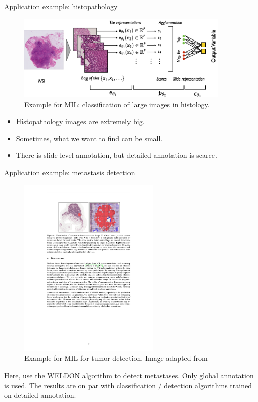 \documentclass[xcolor=pdftex,dvipsnames,table]{beamer}
\begin{document}
\begin{frame}{Application example: histopathology}
\begin{figure}[htb]
   \centering
   \includegraphics[width=0.9\textwidth]{../graphics/histo_ex2.pdf}
   \caption{Example for MIL: classification of large images in histology.}
\end{figure}
\begin{itemize}
\item Histopathology images are extremely big.
\item Sometimes, what we want to find can be small.
\item There is slide-level annotation, but detailed annotation is scarce.
\end{itemize}
\end{frame}


\begin{frame}{Application example: metastasis detection}
\begin{figure}[htb]
   \centering
   \includegraphics[width=0.6\textwidth]{../graphics/wsl_example_histopathology.pdf}
   \caption{Example for MIL for tumor detection. Image adapted from \cite{courtiolClassificationDiseaseLocalization2017}}
\end{figure}
Here, \cite{courtiolClassificationDiseaseLocalization2017} use the WELDON algorithm to detect metastases. Only global annotation is used. The results are on par with classification / detection algorithms trained on detailed annotation. 
\end{frame}
\end{document}
